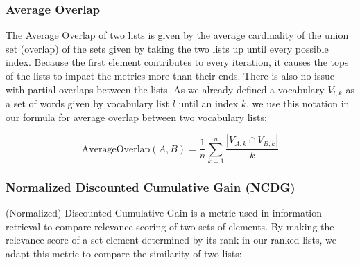 \subsubsection{Average Overlap}
The Average Overlap \cite{webberSimilarityMeasureIndefinite2010} of two lists is given by the average cardinality of the union set (overlap) of the sets given by taking the two lists up until every possible index.
Because the first element contributes to every iteration, it causes the tops of the lists to impact the metrics more than their ends.
There is also no issue with partial overlaps between the lists.
As we already defined a vocabulary $V_{l, k}$ as a set of words given by vocabulary list $l$ until an index $k$, we use this notation in our formula for average overlap between two vocabulary lists:

\begin{equation}
	\text{AverageOverlap}(A, B) = \frac{1}{n} \sum_{k=1}^{n} \frac{|V_{A, k}  \cap V_{B,k}|}{k}
\end{equation}


\subsubsection{Normalized Discounted Cumulative Gain (NCDG)}
(Normalized) Discounted Cumulative Gain \cite{jurafskySpeechLanguageProcessing2025} is a metric used in information retrieval to compare relevance scoring of two sets of elements.
By making the relevance score of a set element determined by its rank in our ranked lists, we adapt this metric to compare the similarity of two lists:

